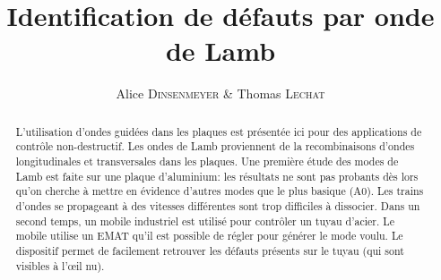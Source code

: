 \documentclass[twoside]{article}
\title{\vspace{-15mm}\fontsize{24pt}{10pt}\selectfont\textbf{Identification de défauts par onde de Lamb}} %
\author{
\large
{Alice \textsc{Dinsenmeyer} \& Thomas \textsc{Lechat}}\\[2mm] %
\vspace{-5mm}
}
\date{}
\begin{document}
\maketitle %

\thispagestyle{fancy} %


\begin{abstract}
L'utilisation d'ondes guidées dans les plaques est présentée ici pour des applications de contrôle non-destructif. Les ondes de Lamb proviennent de la recombinaisons d'ondes longitudinales et transversales dans les plaques. Une première étude des modes de Lamb est faite sur une plaque d'aluminium: les résultats ne sont pas probants dès lors qu'on cherche à mettre en évidence d'autres modes que le plus basique (A0). Les trains d'ondes se propageant à des vitesses différentes sont trop difficiles à dissocier. Dans un second temps, un mobile industriel est utilisé pour contrôler un tuyau d'acier. Le mobile utilise un EMAT qu'il est possible de régler pour générer le mode voulu. Le dispositif permet de facilement retrouver les défauts présents sur le tuyau (qui sont visibles à l’œil nu).

\end{abstract}

\end{document}

